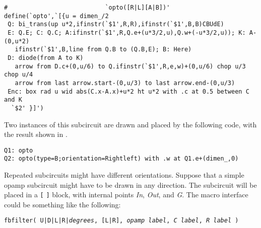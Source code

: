 \begin{verbatim}
#                           `opto([R|L][A|B])'
define(`opto',`[{u = dimen_/2
 Q: bi_trans(up u*2,ifinstr(`$1',R,R),ifinstr(`$1',B,B)CBUdE)
 E: Q.E; C: Q.C; A:ifinstr(`$1',R,Q.e+(u*3/2,u),Q.w+(-u*3/2,u)); K: A-(0,u*2)
   ifinstr(`$1',B,line from Q.B to (Q.B,E); B: Here)
 D: diode(from A to K)
   arrow from D.c+(0,u/6) to Q.ifinstr(`$1',R,e,w)+(0,u/6) chop u/3 chop u/4
   arrow from last arrow.start-(0,u/3) to last arrow.end-(0,u/3)
 Enc: box rad u wid abs(C.x-A.x)+u*2 ht u*2 with .c at 0.5 between C and K
  `$2' }]')
\end{verbatim}
Two instances of this subcircuit are
drawn and placed by the following code, with the result
shown in .
\begin{verbatim}
Q1: opto
Q2: opto(type=B;orientation=Rightleft) with .w at Q1.e+(dimen_,0)
\end{verbatim}


\iffalse
{}
Repeated subcircuits might have different orientations.
Suppose that a simple opamp subcircuit might have to be drawn in any direction.
The subcircuit will be placed in a {\tt [} {\tt ]} block, with
internal points {\sl In}, {\sl Out}, and {\sl G}. 
The macro interface could be something like the following:

{\tt fbfilter( U|D|L|R|{\sl degrees}, [L|R], {\sl opamp label},
  {\sl C label}, {\sl R label} )}

